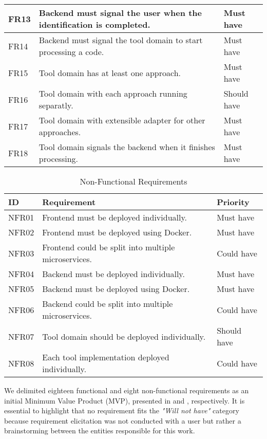 \begin{table}[!htb]
\begin{center}
\begin{tabular}[c]{p{4em}|p{16em}|p{6em}}
      \hline FR13 & Backend must signal the user when the identification is completed. & {Must have} \\
      \hline FR14 & Backend must signal the tool domain to start processing a code. & {Must have} \\
      \hline FR15 & Tool domain has at least one approach. & {Must have} \\
      \hline FR16 & Tool domain with each approach running separatly. & {Should have} \\
      \hline FR17 & Tool domain with extensible adapter for other approaches. & {Must have} \\
      \hline FR18 & Tool domain signals the backend when it finishes processing. & {Must have} \\
    \end{tabular}
  \end{center}
\end{table}

\begin{table}[!htb] \caption{Non-Functional Requirements} \label{tab:non-functional-requirements}
  \begin{center}
    \begin{tabular}[c]{p{4em}|p{16em}|p{6em}}
      \textbf{ID} &
      \textbf{Requirement} &
      \textbf{Priority} \\
      \hline NFR01 & Frontend must be deployed individually. & {Must have} \\
      \hline NFR02 & Frontend must be deployed using Docker. & {Must have} \\
      \hline NFR03 & Frontend could be split into multiple microservices. & {Could have} \\
      \hline NFR04 & Backend must be deployed individually. & {Must have} \\
      \hline NFR05 & Backend must be deployed using Docker. & {Must have} \\
      \hline NFR06 & Backend could be split into multiple microservices. & {Could have} \\
      \hline NFR07 & Tool domain should be deployed individually. & {Should have} \\
      \hline NFR08 & Each tool implementation deployed individually. & {Could have} \\
    \end{tabular}
  \end{center}
\end{table}

We delimited eighteen functional and eight non-functional requirements as an
initial Minimum Value Product (MVP), presented in
 and ,
respectively. It is essential to highlight that no requirement fits the
\textit{"Will not have"} category because requirement elicitation was not
conducted with a user but rather a brainstorming between the entities
responsible for this work.
